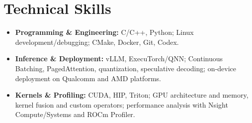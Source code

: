 \documentclass[10pt,a4paper]{article}
\begin{document}
\section{Technical Skills}
\begin{itemize}
  \item \textbf{Programming \& Engineering:} C/C++, Python; Linux development/debugging; CMake, Docker, Git, Codex.
  \item \textbf{Inference \& Deployment:} vLLM, ExecuTorch/QNN; Continuous Batching, PagedAttention,
  quantization, speculative decoding; on-device deployment on Qualcomm and AMD platforms.
  \item \textbf{Kernels \& Profiling:} CUDA, HIP, Triton; GPU architecture and memory, kernel fusion and custom
  operators; performance analysis with Nsight Compute/Systems and ROCm Profiler.
\end{itemize}
\end{document}
